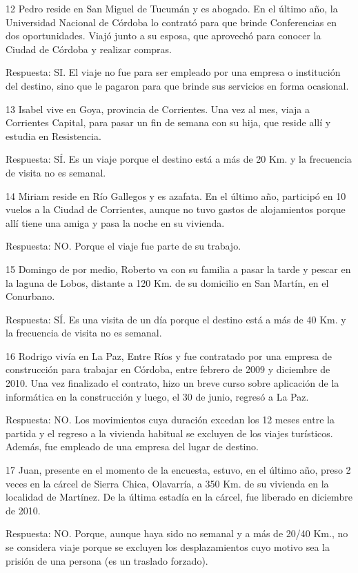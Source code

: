 \documentclass[
  openany]{book}
\begin{document}
12 Pedro reside en San Miguel de Tucumán y es abogado. En el último año, la Universidad Nacional de Córdoba lo contrató para que brinde Conferencias en dos oportunidades. Viajó junto a su esposa, que aprovechó para conocer la Ciudad de Córdoba y realizar compras.

Respuesta: SI. El viaje no fue para ser empleado por una empresa o institución del destino, sino que le pagaron para que brinde sus servicios en forma ocasional.

13 Isabel vive en Goya, provincia de Corrientes. Una vez al mes, viaja a Corrientes Capital, para pasar un fin de semana con su hija, que reside allí y estudia en Resistencia.

Respuesta: SÍ. Es un viaje porque el destino está a más de 20 Km. y la frecuencia de visita no es semanal.

14 Miriam reside en Río Gallegos y es azafata. En el último año, participó en 10 vuelos a la Ciudad de Corrientes, aunque no tuvo gastos de alojamientos porque allí tiene una amiga y pasa la noche en su vivienda.

Respuesta: NO. Porque el viaje fue parte de su trabajo.

15 Domingo de por medio, Roberto va con su familia a pasar la tarde y pescar en la laguna de Lobos, distante a 120 Km. de su domicilio en San Martín, en el Conurbano.

Respuesta: SÍ. Es una visita de un día porque el destino está a más de 40 Km. y la frecuencia de visita no es semanal.

16 Rodrigo vivía en La Paz, Entre Ríos y fue contratado por una empresa de construcción para trabajar en Córdoba, entre febrero de 2009 y diciembre de 2010. Una vez finalizado el contrato, hizo un breve curso sobre aplicación de la informática en la construcción y luego, el 30 de junio, regresó a La Paz.

Respuesta: NO. Los movimientos cuya duración excedan los 12 meses entre la partida y el regreso a la vivienda habitual se excluyen de los viajes turísticos. Además, fue empleado de una empresa del lugar de destino.

17 Juan, presente en el momento de la encuesta, estuvo, en el último año, preso 2 veces en la cárcel de Sierra Chica, Olavarría, a 350 Km. de su vivienda en la localidad de Martínez. De la última estadía en la cárcel, fue liberado en diciembre de 2010.

Respuesta: NO. Porque, aunque haya sido no semanal y a más de 20/40 Km., no se considera viaje porque se excluyen los desplazamientos cuyo motivo sea la prisión de una persona (es un traslado forzado).
\end{document}
